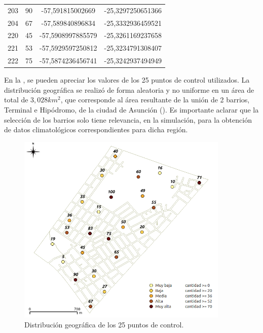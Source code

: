 \begin{table}[!htpb]
\begin{minipage}{\textwidth}
\begin{tabular}{c c c c}
            203 & 90 & -57,591815002669 & -25,3297250651366 \\
            204 & 67 & -57,589840896834 & -25,3332936459521 \\
            220 & 45 & -57,5908997885579 & -25,3261169237658 \\
            221 & 53 & -57,5929597250812 & -25,3234791308407 \\
            222 & 75 & -57,5874236456741 & -25,3242937494949 \\
        \end{tabular}
    \end{minipage}
\end{table}

En la , se pueden apreciar los valores de los 25 puntos de
control utilizados. La distribución geográfica se realizó de forma aleatoria y no uniforme
en un área de total de $3,028 km^{2}$, que corresponde al área resultante de la unión de 2
barrios, Terminal e Hipódromo, de la ciudad de Asunción ().
Es importante aclarar que la selección de los barrios solo tiene relevancia, en la simulación,
para la obtención de datos climatológicos correspondientes para dicha región.

\begin{figure}[!htpb]
\centering
\includegraphics[width=0.9\textwidth]{./capitulo-6/graphics/extension-poblacion.png}
\caption{\label{fig:distribucion-puntos}Distribución geográfica de los 25 puntos de control.}
\end{figure}


